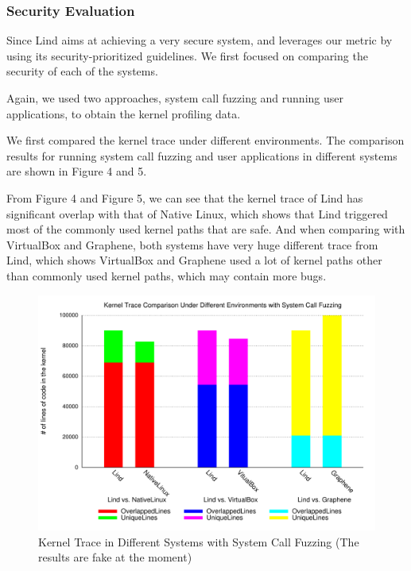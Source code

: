 \subsubsection{Security Evaluation}
Since Lind aims at achieving a very secure system, and leverages our metric by using its 
security-prioritized guidelines. We first focused on comparing the security of each of the systems.


Again, we used two approaches, system call fuzzing and running user applications, to obtain the
kernel profiling data. 

We first compared the kernel trace under different environments.
The comparison results for running system call fuzzing and user applications in different systems 
are shown in Figure 4 and 5.

From Figure 4 and Figure 5, we can see that the kernel trace of Lind has significant overlap with that of Native Linux, 
which shows that Lind triggered most of the commonly used kernel paths that are safe. And when comparing 
with VirtualBox and Graphene, both systems have very huge different trace from Lind, which shows VirtualBox and Graphene
used a lot of kernel paths other than commonly used kernel paths, which may contain more bugs.  

\begin{figure}[h]
\centering
\includegraphics[width=1.0\columnwidth]{diagram/lind_ccs15_diagram_03.pdf}
\caption{Kernel Trace in Different Systems with System Call Fuzzing {\color{red}(The results are fake at the moment)} }
\label{fig:different_systems_systemcallfuzzing_trace}
\end{figure}

